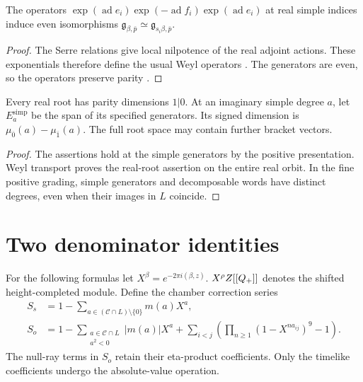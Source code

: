 \begin{lemma}
\label{lem:bkm-weyl-transport-parity}
The operators
$\exp(\operatorname{ad}e_i)\exp(-\operatorname{ad}f_i)
 \exp(\operatorname{ad}e_i)$ at real simple indices induce even
isomorphisms
$\mathfrak g_{\beta,\bar p}\simeq\mathfrak g_{s_i\beta,\bar p}$.
\end{lemma}
\begin{proof}
The Serre relations give local nilpotence of the real adjoint
actions. These exponentials therefore define the usual Weyl
operators \cite[Chapter~3]{KAC:1}. The generators are even, so the
operators preserve parity \cite[Section~6]{GN}.
\end{proof}

\begin{lemma}
\label{lem:bkm-real-root-multiplicity-one}
Every real root has parity dimensions $1|0$.
\label{lem:bkm-imaginary-simple-fibre}
At an imaginary simple degree $a$, let $E_a^{\mathrm{simp}}$ be
the span of its specified generators. Its signed dimension is
$\mu_{\overline0}(a)-\mu_{\overline1}(a)$. The full root space
may contain further bracket vectors.
\end{lemma}
\begin{proof}
The assertions hold at the simple generators by the positive
presentation. Weyl transport proves the real-root assertion on
the entire real orbit. In the fine positive grading, simple
generators and decomposable words have distinct degrees, even when
their images in $L$ coincide.
\end{proof}

\section{Two denominator identities}
\label{sec:bkm-denominator-identity}
\label{sec:bkm-denominator-consistency}

For the following formulas let $X^\beta=e^{-2\pi i(\beta,z)}$.
$X^\rho Z[[Q_+]]$ denotes the shifted height-completed module.
Define the chamber correction series
\begin{align*}
 S_s&=1-\sum_{a\in(\mathcal C\cap L)\setminus\{0\}}m(a)X^a,\\
 S_o&=1-\sum_{\substack{a\in\mathcal C\cap L\\a^2<0}}|m(a)|X^a
       +\sum_{i<j}\left(\prod_{n\geq1}(1-X^{na_{ij}})^9-1\right).
\end{align*}
The null-ray terms in $S_o$ retain their eta-product coefficients.
Only the timelike coefficients undergo the absolute-value operation.

